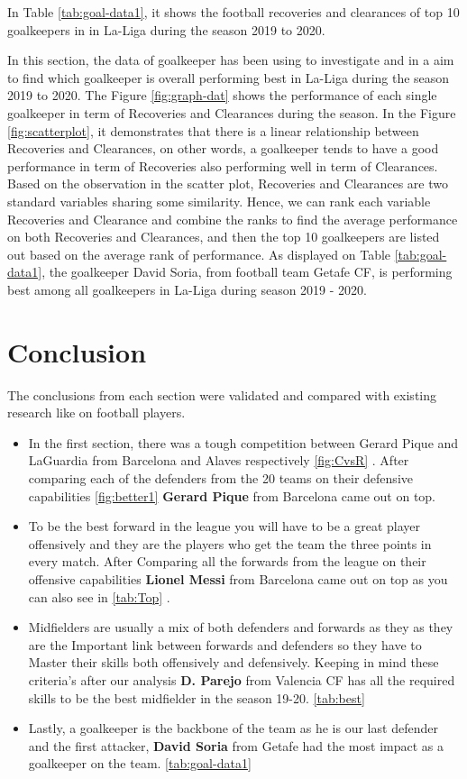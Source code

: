 \documentclass[11pt,a4paper,]{article}
\begin{document}
In Table \ref{tab:goal-data1}, it shows the football recoveries and clearances of top 10 goalkeepers in in La-Liga during the season 2019 to 2020.

In this section, the data of goalkeeper has been using to investigate and in a aim to find which goalkeeper is overall performing best in La-Liga during the season 2019 to 2020. The Figure \ref{fig:graph-dat} shows the performance of each single goalkeeper in term of Recoveries and Clearances during the season. In the Figure \ref{fig:scatterplot}, it demonstrates that there is a linear relationship between Recoveries and Clearances, on other words, a goalkeeper tends to have a good performance in term of Recoveries also performing well in term of Clearances. Based on the observation in the scatter plot, Recoveries and Clearances are two standard variables sharing some similarity. Hence, we can rank each variable Recoveries and Clearance and combine the ranks to find the average performance on both Recoveries and Clearances, and then the top 10 goalkeepers are listed out based on the average rank of performance. As displayed on Table \ref{tab:goal-data1}, the goalkeeper David Soria, from football team Getafe CF, is performing best among all goalkeepers in La-Liga during season 2019 - 2020.

\hypertarget{conclusion}{%
\section{Conclusion}\label{conclusion}}

The conclusions from each section were validated and compared with existing research like \textcite{brito2019new} on football players.

\begin{itemize}
\item
  In the first section, there was a tough competition between Gerard Pique and LaGuardia from Barcelona and Alaves respectively \ref{fig:CvsR} . After comparing each of the defenders from the 20 teams on their defensive capabilities \ref{fig:better1} \textbf{Gerard Pique} from Barcelona came out on top.
\item
  To be the best forward in the league you will have to be a great player offensively and they are the players who get the team the three points in every match. After Comparing all the forwards from the league on their offensive capabilities \textbf{Lionel Messi} from Barcelona came out on top as you can also see in \ref{tab:Top} .
\item
  Midfielders are usually a mix of both defenders and forwards as they as they are the Important link between forwards and defenders so they have to Master their skills both offensively and defensively. Keeping in mind these criteria's after our analysis \textbf{D. Parejo} from Valencia CF has all the required skills to be the best midfielder in the season 19-20. \ref{tab:best}
\item
  Lastly, a goalkeeper is the backbone of the team as he is our last defender and the first attacker, \textbf{David Soria} from Getafe had the most impact as a goalkeeper on the team. \ref{tab:goal-data1}
\end{itemize}

\printbibliography
\end{document}
